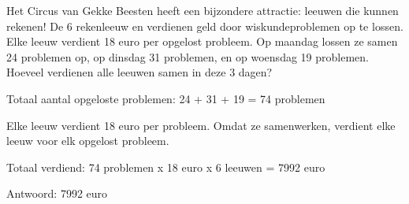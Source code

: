 \begin{opgave}
Het Circus van Gekke Beesten heeft een bijzondere attractie: leeuwen die 
kunnen rekenen! De 6 rekenleeuw en verdienen geld door wiskundeproblemen op 
te lossen. Elke leeuw verdient 18 euro per opgelost probleem. Op maandag 
lossen ze samen 24 problemen op, op dinsdag 31 problemen, en op woensdag 19 
problemen. Hoeveel verdienen alle leeuwen samen in deze 3 dagen?
\end{opgave}

\begin{oplossing}
Totaal aantal opgeloste problemen:
24 + 31 + 19 = 74 problemen

Elke leeuw verdient 18 euro per probleem.
Omdat ze samenwerken, verdient elke leeuw voor elk opgelost probleem.

Totaal verdiend:
74 problemen x 18 euro x 6 leeuwen = 7992 euro

Antwoord: 7992 euro
\end{oplossing}